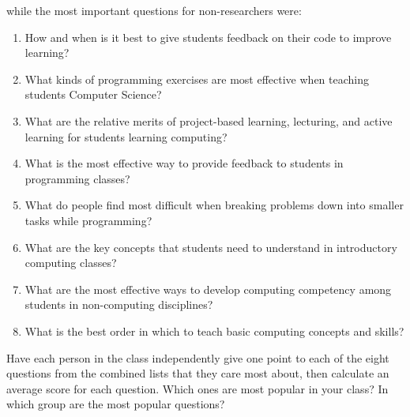 \noindent
while the most important questions for non-researchers were:

\begin{enumerate}

\item
  How and when is it best to give students feedback on their code to improve learning?

\item
  What kinds of programming exercises are most effective when teaching students Computer Science?

\item
  What are the relative merits of project-based learning, lecturing, and active learning for students learning computing?

\item
  What is the most effective way to provide feedback to students in programming classes?

\item
  What do people find most difficult when breaking problems down into smaller tasks while programming?

\item
  What are the key concepts that students need to understand in introductory computing classes?

\item
  What are the most effective ways to develop computing competency among students in non-computing disciplines?

\item
  What is the best order in which to teach basic computing concepts and skills?

\end{enumerate}

Have each person in the class independently give one point to
each of the eight questions from the combined lists that they care most about,
then calculate an average score for each question.
Which ones are most popular in your class?
In which group are the most popular questions?
